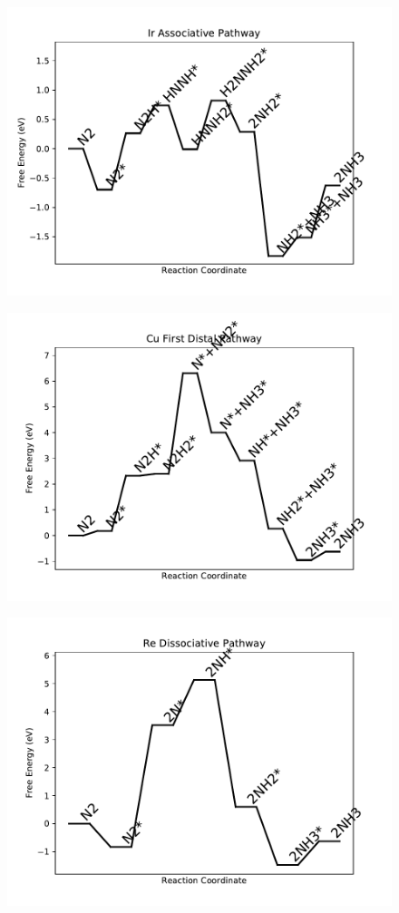 \begin{figure}
\includegraphics[width=0.8\linewidth]{data/plots/Ir_associative.pdf}
\end{figure}

\begin{figure}
\includegraphics[width=0.8\linewidth]{data/plots/Cu_distal_1.pdf}
\end{figure}

\begin{figure}
\includegraphics[width=0.8\linewidth]{data/plots/Re_dissociative.pdf}
\end{figure}


